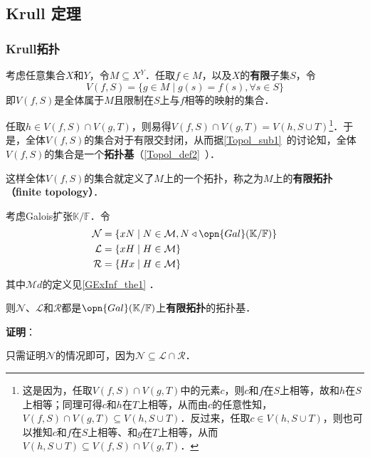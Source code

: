 \subsection{Krull 定理}\label{GExInf_sub1}


\subsubsection{Krull拓扑}

考虑任意集合$X$和$Y$，令$M\subseteq X^Y$．任取$f\in M$，以及$X$的\textbf{有限}子集$S$，令
\begin{equation}
V(f, S) = \{g\in M\mid g(s)=f(s), \forall s\in S\}
\end{equation}
即$V(f, S)$是全体属于$M$且限制在$S$上与$f$相等的映射的集合．

任取$h\in V(f, S)\cap V(g, T)$，则易得$V(f, S)\cap V(g, T) = V(h, S\cup T)$\footnote{这是因为，任取$V(f, S)\cap V(g, T)$中的元素$c$，则$c$和$f$在$S$上相等，故和$h$在$S$上相等；同理可得$c$和$h$在$T$上相等，从而由$c$的任意性知，$V(f, S)\cap V(g, T)\subseteq V(h, S\cup T)$．反过来，任取$c\in V(h, S\cup T)$，则也可以推知$c$和$f$在$S$上相等、和$g$在$T$上相等，从而$V(h, S\cup T)\subseteq V(f, S)\cap V(g, T)$．}．于是，全体$V(f, S)$的集合对于有限交封闭，从而据\autoref{Topol_sub1}~的讨论知，全体$V(f, S)$的集合是一个\textbf{拓扑基}（\autoref{Topol_def2}~）．

这样全体$V(f, S)$的集合就定义了$M$上的一个拓扑，称之为$M$上的\textbf{有限拓扑（finite topology）}．



\begin{theorem}{}
考虑Galois扩张$\mathbb{K}/\mathbb{F}$．令
\begin{equation}
\begin{aligned}
\mathcal{N} &= \{xN\mid N\in\mathcal{M}, N\triangleleft\opn{Gal}(\mathbb{K}/\mathbb{F})\}\\
\mathcal{L} &= \{xH\mid H\in\mathcal{M}\}\\
\mathcal{R} &= \{Hx\mid H\in\mathcal{M}\}
\end{aligned}
\end{equation}
其中$\mathcal{M}d$的定义见\autoref{GExInf_the1} ．

则$\mathcal{N}$、$\mathcal{L}$和$\mathcal{R}$都是$\opn{Gal}(\mathbb{K}/\mathbb{F})$上\textbf{有限拓扑}的拓扑基．
\end{theorem}

\textbf{证明}：

只需证明$\mathcal{N}$的情况即可，因为$\mathcal{N}\subseteq \mathcal{L}\cap\mathcal{R}$．

